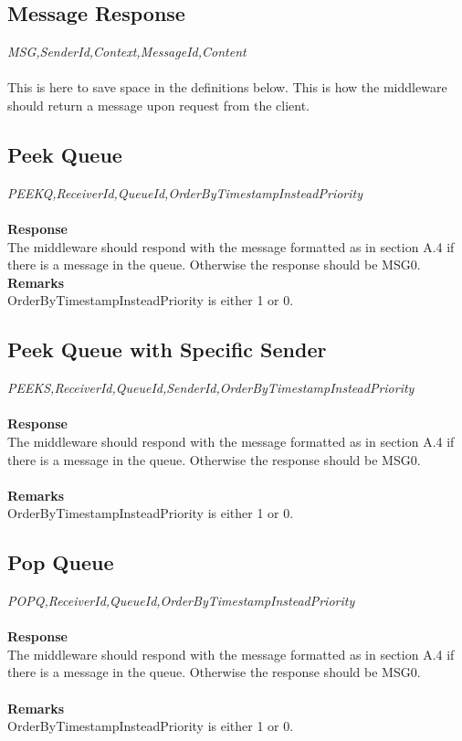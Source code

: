\documentclass{article}
\begin{document}
            \subsection{Message Response}
                \indent\indent\textit{MSG,SenderId,Context,MessageId,Content}\\
                \\
                This is here to save space in the definitions below. This is how the middleware should return a message upon request from the client.

            \subsection{Peek Queue}
                \indent\indent \textit{PEEKQ,ReceiverId,QueueId,OrderByTimestampInsteadPriority}\\
                \\
                \textbf{Response}\\
                The middleware should respond with the message formatted as in section A.4 if there is a message in the queue. Otherwise the response should be MSG0.\\
                \textbf{Remarks}\\
                OrderByTimestampInsteadPriority is either 1 or 0.

            \subsection{Peek Queue with Specific Sender}
                \indent\indent\textit{PEEKS,ReceiverId,QueueId,SenderId,OrderByTimestampInsteadPriority}\\
            \\
            \textbf{Response}\\
            The middleware should respond with the message formatted as in section A.4 if there is a message in the queue. Otherwise the response should be MSG0.\\
            \\
            \textbf{Remarks}\\
            OrderByTimestampInsteadPriority is either 1 or 0.


            \subsection{Pop Queue}
                \indent\indent\textit{POPQ,ReceiverId,QueueId,OrderByTimestampInsteadPriority}\\
                \\
                \textbf{Response}\\
                The middleware should respond with the message formatted as in section A.4 if there is a message in the queue. Otherwise the response should be MSG0.\\
                \\
                \textbf{Remarks}\\
                OrderByTimestampInsteadPriority is either 1 or 0.
\end{document}
